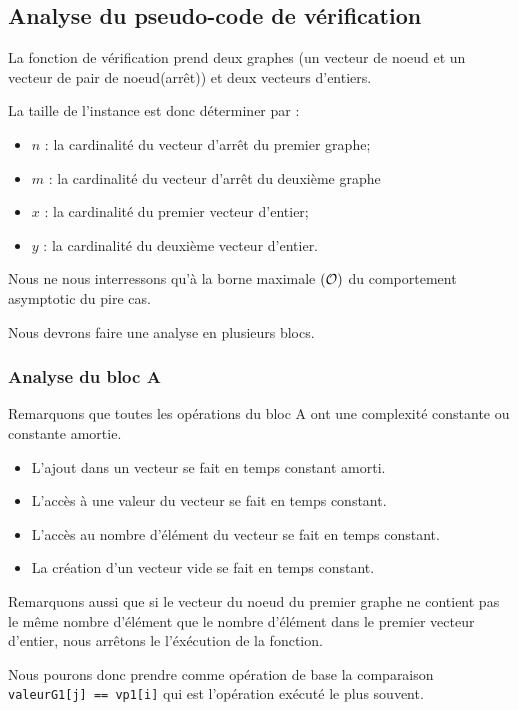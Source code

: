 \documentclass[class=article]{standalone}
\begin{document}
\subsection*{Analyse du pseudo-code de vérification}

La fonction de vérification prend deux graphes 
(un vecteur de noeud et un vecteur de pair de noeud(arrêt))
et deux vecteurs d'entiers.

La taille de l'instance est donc déterminer par :
\begin{itemize}
  \item $n$ : la cardinalité du vecteur d'arrêt du premier graphe;
  \item $m$ : la cardinalité du vecteur d'arrêt du deuxième graphe
  \item $x$ : la cardinalité du premier vecteur d'entier;
  \item $y$ : la cardinalité du deuxième vecteur d'entier.
\end{itemize}

Nous ne nous interressons qu'à la borne maximale $\left ( \mathcal{O} \right )$ 
du comportement asymptotic du pire cas.

Nous devrons faire une analyse en plusieurs blocs.

\subsubsection*{Analyse du bloc A}

Remarquons que toutes les opérations du bloc A 
ont une complexité constante ou constante amortie.

\begin{itemize}
  \item L'ajout dans un vecteur se fait en temps constant amorti.
  \item L'accès à une valeur du vecteur se fait en temps constant.
  \item L'accès au nombre d'élément du vecteur se fait en temps constant.
  \item La création d'un vecteur vide se fait en temps constant.
\end{itemize}

Remarquons aussi que si le vecteur du noeud du premier graphe
ne contient pas le même nombre d'élément que le nombre d'élément 
dans le premier vecteur d'entier, nous arrêtons le l'éxécution de
la fonction.

Nous pourons donc prendre comme opération de base
la comparaison \lstinline{valeurG1[j] == vp1[i]} qui
est l'opération exécuté le plus souvent.
\end{document}
